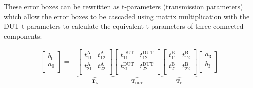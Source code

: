 \documentclass[../thesis/thesis.tex]{subfiles}
\begin{document}
\begin{refsection}
These error boxes can be rewritten as t-parameters (transmission parameters) which allow the error boxes to be cascaded using matrix multiplication with the DUT t-parameters to calculate the equivalent t-parameters of three connected components:

\begin{align}
\begin{bmatrix}
b_0 \\
a_0 \\
\end{bmatrix}
=
&\underbrace{
	\begin{bmatrix}
	t^\textrm{A}_{11} & t^\textrm{A}_{12} \\
	t^\textrm{A}_{21} & t^\textrm{A}_{22} \\
	\end{bmatrix}
}_{\mathbf{T}_\textrm{A}}
\underbrace{
	\begin{bmatrix}
	t^\textrm{DUT}_{11} & t^\textrm{DUT}_{12} \\
	t^\textrm{DUT}_{21} & t^\textrm{DUT}_{22} \\
	\end{bmatrix}
}_{\mathbf{T}_\textrm{DUT}}
\underbrace{
	\begin{bmatrix}
	t^\textrm{B}_{11} & t^\textrm{B}_{12} \\
	t^\textrm{B}_{21} & t^\textrm{B}_{22} \\
	\end{bmatrix}
}_{\mathbf{T}_\textrm{B}}
\begin{bmatrix}
a_3 \\
b_3 \\
\end{bmatrix}
\end{align}


\end{refsection}
\end{document}
